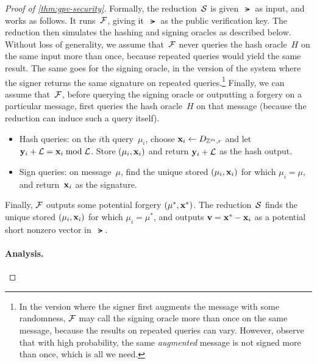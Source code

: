 \documentclass[11pt]{article}
\begin{document}
\begin{proof}[Proof of \cref{thm:gpv-security}]
  Formally, the reduction~$\mathcal{S}$ is given~$\lat$ as input, and works
  as follows. It runs~$\mathcal{F}$, giving it~$\lat$ as the public
  verification key. The reduction then simulates the hashing and
  signing oracles as described below. Without loss of generality, we
  assume that~$\mathcal{F}$ never queries the hash oracle~$H$ on the same
  input more than once, because repeated queries would yield the same
  result. The same goes for the signing oracle, in the version of the
  system where the signer returns the same signature on repeated
  queries.\footnote{In the version where the signer first augments the
    message with some randomness, $\mathcal{F}$ may call the signing
    oracle more than once on the same message, because the results on
    repeated queries can vary. However, observe that with high
    probability, the same \emph{augmented} message is not signed more
    than once, which is all we need.} Finally, we can assume
  that~$\mathcal{F}$, before querying the signing oracle or outputting a
  forgery on a particular message, first queries the hash oracle~$H$
  on that message (because the reduction can induce such a query
  itself).
  \begin{itemize}
  \item Hash queries: on the $i$th query~$\mu_{i}$, choose
    $\mathbf{x}_{i} \gets D_{\mathbb{Z}^{m},r}$ and let
    $\mathbf{y}_{i} + \mathcal{L} = \mathbf{x}_{i} \bmod \mathcal{L}$. Store
    $(\mu_{i}, \mathbf{x}_{i})$ and return $\mathbf{y}_{i} + \mathcal{L}$ as the hash
    output.

  \item Sign queries: on message~$\mu$, find the unique stored
    $(\mu_{i}, \mathbf{x}_{i})$ for which $\mu_{i} = \mu$, and
    return~$\mathbf{x}_{i}$ as the signature.
  \end{itemize}
  Finally, $\mathcal{F}$ outputs some potential forgery
  $(\mu^{*}, \mathbf{x}^{*})$. The reduction~$\mathcal{S}$ finds the unique stored
  $(\mu_{i}, \mathbf{x}_{i})$ for which $\mu_{i} = \mu^{*}$, and outputs
  $\mathbf{v} = \mathbf{x}^{*} - \mathbf{x}_{i}$ as a potential short nonzero vector
  in~$\lat$.

  \paragraph{Analysis.}


\end{proof}
\end{document}
